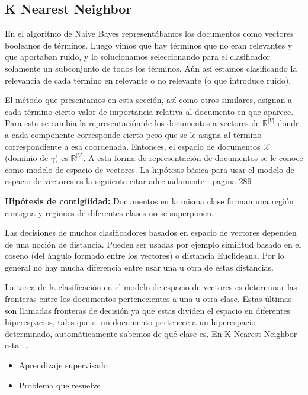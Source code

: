 \documentclass{llncs}
\begin{document}
	\subsection{K Nearest Neighbor}
	
		En el algoritmo de Naive Bayes represent\'abamos los documentos como vectores booleanos de t\'erminos. Luego vimos que hay t\'erminos que no eran relevantes y que aportaban ruido, y lo solucionamos seleccionando para el clasificador solamente un subconjunto de todos los t\'erminos. A\'un as\'i estamos clasificando la relevancia de cada t\'ermino  en relevante o no relevante (o que introduce ruido).
		
		 El m\'etodo que presentamos en esta secci\'on, as\'i como otros similares, asignan a cada t\'ermino cierto valor de importancia relativa al documento en que aparece. Para esto se cambia la representaci\'on de los documentos a vectores de $\mathbb{R}^{|V|}$ donde a cada componente corresponde cierto peso que se le asigna al t\'ermino correspondiente a esa coordenada. Entonces, el espacio de documentos $\mathcal{X}$ (dominio de $\gamma$) es $\mathbb{R}^{|V|}$. A esta forma de representaci\'on de documentos se le conoce como modelo de espacio de vectores. La hip\'otesis b\'asica para usar el modelo de espacio de vectores es la siguiente \color{red} citar adecuadamente : pagina 289 \color{black}
		 
		 \textbf{Hip\'otesis de contig\"uidad:} Documentos en la misma clase forman una regi\'on contigua  y regiones de diferentes clases no se superponen.
		 
		 Las decisiones de muchos clasificadores basados en espacio de vectores dependen de una noci\'on de distancia. Pueden ser usadas por ejemplo similitud basado en el coseno (del \'angulo formado entre los vectores) o distancia Euclideana. Por lo general no hay mucha diferencia entre usar una u otra de estas distancias.
		 
		 La tarea de la clasificaci\'on en el modelo de espacio de vectores es determinar las fronteras entre los documentos pertenecientes a una u otra clase. Estas \'ultimas son llamadas fronteras de decisi\'on ya que estas dividen el espacio en diferentes hiperespacios, tales que si un documento pertenece a un hiperespacio determinado, autom\'aticamente sabemos de qu\'e clase es. En K Nearest Neighbor esta ...
	
\begin{itemize}
	\item Aprendizaje supervisado
	
	\item Problema que resuelve
\end{itemize}
\end{document}
